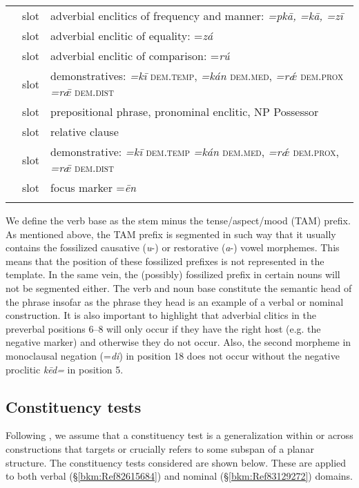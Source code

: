 \documentclass[output=paper]{langscibook}
\begin{document}
\begin{table}[p]
\begin{tabular}{Tlp{9cm}}
\label{znadv13} & slot & adverbial enclitics of frequency and manner: \textit{=pkā, =kā, =zī}\\
\label{znadv14} & slot & adverbial enclitic of equality: =\textit{zá}\\
\label{znadv15} & slot & adverbial enclitic of comparison: =\textit{rú}\\
\label{zndem16} & slot & demonstratives: \textit{=kī} \textsc{dem.temp},
\textit{=kán} \textsc{dem.med}, \textit{=rǽ} \textsc{dem.prox} \textit{=rǣ } \textsc{dem.dist}\\
\label{znpp17} & slot & prepositional phrase,
pronominal enclitic, NP Possessor\\
\label{znrc18} & slot & relative clause\\
\label{zndem19} & slot & demonstrative: \textit{=kī} \textsc{dem.temp}
\textit{=kán} \textsc{dem.med}, \textit{=rǽ} \textsc{dem.prox}, \textit{=rǣ} \textsc{dem.dist}\\
\label{znfoc20} & slot & focus marker =\textit{ēn}\\
    \lspbottomrule
\end{tabular}
\end{table}

We define the verb base as the stem minus the tense/aspect/mood (TAM) prefix. As mentioned above, the TAM prefix is segmented in such way that it usually contains the fossilized causative (\textit{u}-) or restorative (\textit{a}-) vowel morphemes. This means that the position of these fossilized prefixes is not represented in the template. In the same vein, the (possibly) fossilized prefix in certain nouns will not be segmented either. The verb and noun base constitute the semantic head of the phrase insofar as the phrase they head is an example of a verbal or nominal construction. It is also important to highlight that adverbial clitics in the preverbal positions 6–8 will only occur if they have the right host (e.g. the negative marker) and otherwise they do not occur. Also, the second morpheme in monoclausal negation (=\textit{di}) in position 18 does not occur without the negative proclitic \textit{kēd=} in position 5.


\subsection{Constituency tests} 

Following \citet{Tallman2021}, we assume that a constituency test is a generalization within or across constructions that targets or crucially refers to some subspan of a planar structure. The constituency tests considered are shown below. These are applied to both verbal (§\ref{bkm:Ref82615684}) and nominal (§\ref{bkm:Ref83129272}) domains.
\end{document}
